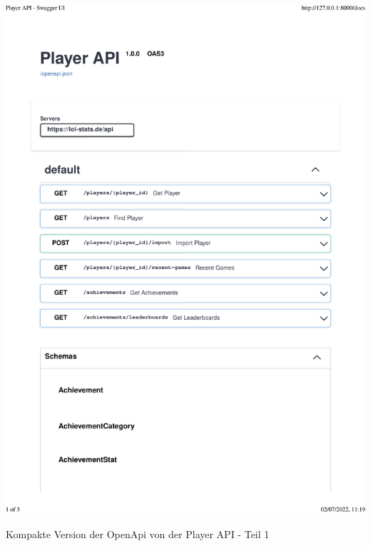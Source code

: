 \begin{center}
  \includegraphics[width=1\textwidth, page=1]{images/pdfs/player-api-openapi-short.pdf}
  \caption{Kompakte Version der OpenApi von der Player API - Teil 1}
  \label{fig:compact_player_openapi_1}
\end{center}
